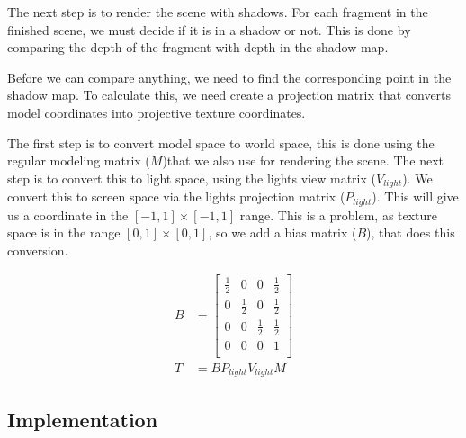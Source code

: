 The next step is to render the scene with shadows. For each fragment
in the finished scene, we must decide if it is in a shadow or
not. This is done by comparing the depth of the fragment with depth in
the shadow map.


Before we can compare anything, we need to find the corresponding
point in the shadow map. To calculate this, we need create a
projection matrix that converts model coordinates into projective
texture coordinates.

The first step is to convert model space to world space, this is done
using the regular modeling matrix ($M$)that we also use for rendering
the scene. The next step is to convert this to light space, using the
lights view matrix ($V_{light}$). We convert this to screen space via
the lights projection matrix ($P_{light}$). This will give us a
coordinate in the $[-1,1] \times [-1,1]$ range. This is a problem, as
texture space is in the range $[0,1] \times [0,1]$, so we add a bias
matrix ($B$), that does this conversion.

\begin{align*}
  B &= \begin{bmatrix}
    \frac{1}{2} & 0   & 0   & \frac{1}{2} \\
    0   & \frac{1}{2} & 0   & \frac{1}{2} \\
    0   & 0   & \frac{1}{2} & \frac{1}{2} \\
    0   & 0   & 0   & 1   \\
  \end{bmatrix} \\
  T &= BP_{light}V_{light}M
\end{align*}









\subsection{Implementation}

